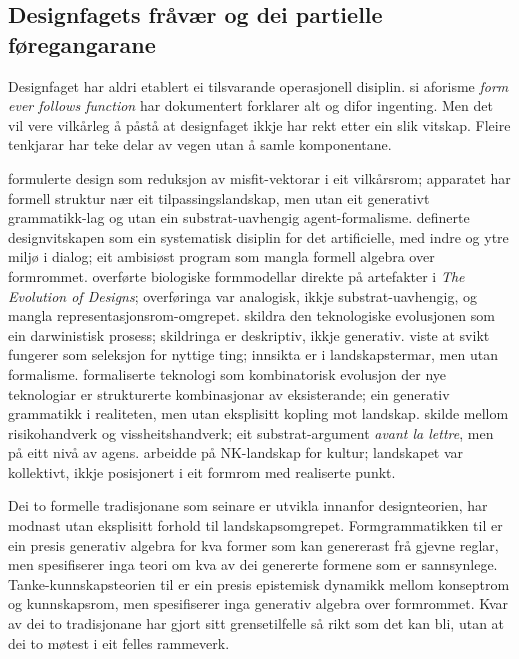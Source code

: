 \documentclass[10pt,a4paper,twocolumn]{article}
\begin{document}
\subsection{Designfagets fråvær og dei partielle føregangarane}

Designfaget har aldri etablert ei tilsvarande operasjonell disiplin. \citet{sullivan1896} si aforisme \textit{form ever follows function} har \citet{michl1995} dokumentert forklarer alt og difor ingenting. Men det vil vere vilkårleg å påstå at designfaget ikkje har rekt etter ein slik vitskap. Fleire tenkjarar har teke delar av vegen utan å samle komponentane.

\citet{alexander1964} formulerte design som reduksjon av misfit-vektorar i eit vilkårsrom; apparatet har formell struktur nær eit tilpassingslandskap, men utan eit generativt grammatikk-lag og utan ein substrat-uavhengig agent-formalisme. \citet{simon1969} definerte designvitskapen som ein systematisk disiplin for det artificielle, med indre og ytre miljø i dialog; eit ambisiøst program som mangla formell algebra over formrommet. \citet{steadman1979} overførte biologiske formmodellar direkte på artefakter i \textit{The Evolution of Designs}; overføringa var ana\-logisk, ikkje substrat-uavhengig, og mangla representasjonsrom-omgrepet. \citet{basalla1988} skildra den teknologiske evolusjonen som ein darwinistisk prosess; skildringa er deskriptiv, ikkje generativ. \citet{petroski1992} viste at svikt fungerer som seleksjon for nyttige ting; innsikta er i landskapstermar, men utan formalisme. \citet{wbarthur2009} formaliserte teknologi som kombinatorisk evolusjon der nye teknologiar er strukturerte kombinasjonar av eksisterande; ein generativ grammatikk i realiteten, men utan eksplisitt kopling mot landskap. \citet{pye1968} skilde mellom risikohandverk og vissheitshandverk; eit substrat-argument \textit{avant la lettre}, men på eitt nivå av agens. \citet{kauffman1993} arbeidde på NK-landskap for kultur; landskapet var kollektivt, ikkje posisjonert i eit formrom med realiserte punkt.

Dei to formelle tradisjonane som seinare er utvikla innanfor designteorien, har modnast utan eksplisitt forhold til landskapsomgrepet. Formgrammatikken til \citet{stinygips1972} er ein presis generativ algebra for kva former som kan genererast frå gjevne reglar, men spesifiserer inga teori om kva av dei genererte formene som er sannsynlege. Tanke-kunnskapsteorien til \citet{hatchuelweil2003, hatchuelweil2009} er ein presis epistemisk dynamikk mellom konseptrom og kunnskapsrom, men spesifiserer inga generativ algebra over formrommet. Kvar av dei to tradisjonane har gjort sitt grensetilfelle så rikt som det kan bli, utan at dei to møtest i eit felles rammeverk.
\end{document}
